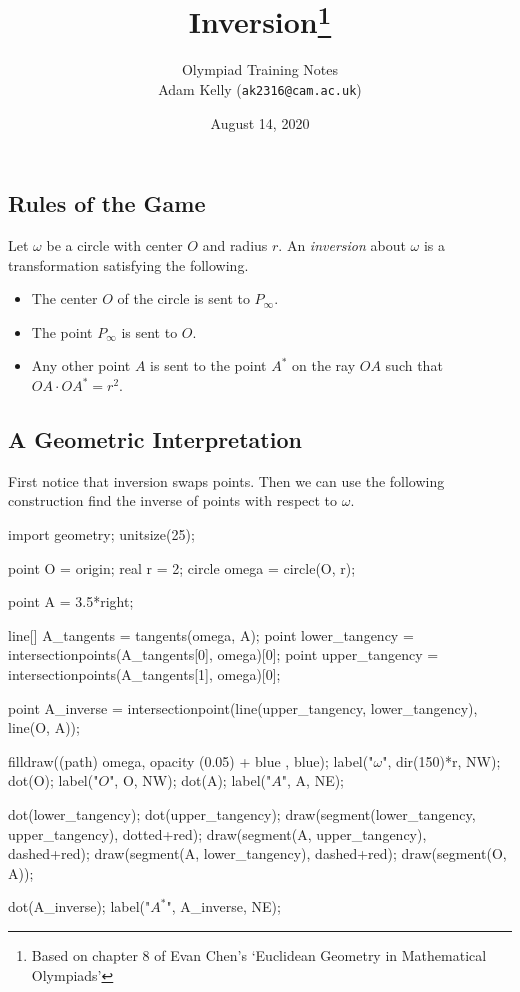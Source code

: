 \documentclass[]{scrartcl}
\begin{document}
\title{Inversion\thanks{Based on chapter 8 of Evan Chen's `Euclidean Geometry in Mathematical Olympiads'}}
\author{Olympiad Training Notes\\ Adam Kelly (\texttt{ak2316@cam.ac.uk})}
\date{August 14, 2020}
\maketitle

\subsection*{Rules of the Game}

Let $\omega$ be a circle with center $O$ and radius $r$. An \emph{inversion} about $\omega$ is a transformation satisfying the following.

\begin{itemize}
	\item The center $O$ of the circle is sent to $P_\infty$.
	\item The point $P_\infty$ is sent to $O$.
	\item Any other point $A$ is sent to the point $A^*$ on the ray $OA$ such that $OA \cdot OA^* = r^2$.
\end{itemize}

\subsection*{A Geometric Interpretation}

First notice that inversion swaps points. Then we can use the following construction find the inverse of points with respect to $\omega$.

\begin{center}
	\begin{asy}
	import geometry;
	unitsize(25);

	point O = origin;
	real r = 2;
	circle omega = circle(O, r);

	point A = 3.5*right;

	line[] A_tangents = tangents(omega, A);
	point lower_tangency = intersectionpoints(A_tangents[0], omega)[0];
	point upper_tangency = intersectionpoints(A_tangents[1], omega)[0];

	point A_inverse = intersectionpoint(line(upper_tangency, lower_tangency), line(O, A));

	filldraw((path) omega, opacity (0.05) + blue , blue);
	label("$\omega$", dir(150)*r, NW);
	dot(O); label("$O$", O, NW);
	dot(A); label("$A$", A, NE);
	
	dot(lower_tangency);
	dot(upper_tangency);
	draw(segment(lower_tangency, upper_tangency), dotted+red);
	draw(segment(A, upper_tangency), dashed+red);
	draw(segment(A, lower_tangency), dashed+red);
	draw(segment(O, A));

	dot(A_inverse); label("$A^*$", A_inverse, NE);
	\end{asy}
\end{center}
\end{document}
